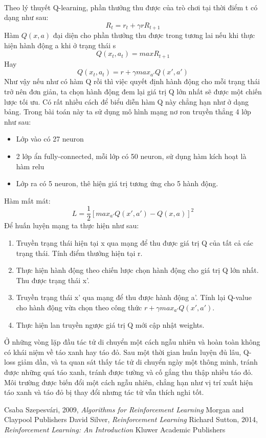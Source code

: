 \documentclass[14pt,a4paper,oneside]{report}		%
\begin{document}
\\
Theo lý thuyết Q-learning, phần thưởng thu được của trò chơi tại thời điểm t có dạng như sau:
$$R_t = r_t+\gamma rR_{t+1}$$
Hàm $Q(x,a)$ đại diện cho phần thưởng thu được trong tương lai nếu khi thực hiện hành động a khi ở trạng thái s 
$$Q(x_t,a_t) = maxR_{t+1}$$
Hay 
$$Q(x_t,a_t) = r + \gamma max_{a'}Q(x',a')$$
Như vậy nếu như có hàm Q rồi thì việc quyết định hành động cho mỗi trạng thái trở nên đơn giản, ta chọn hành động đem lại giá trị Q lớn nhất sẽ được một chiến lược tối ưu. Có rất nhiều cách để biểu diễn hàm Q này chẳng hạn như ở dạng bảng. Trong bài toán này ta sử dụng mô hình mạng nơ ron truyền thẳng 4 lớp như sau:
\begin{itemize}
\item Lớp vào có 27 neuron
\item 2 lớp ẩn fully-connected, mỗi lớp có 50 neuron, sử dụng hàm kích hoạt là hàm relu
\item Lớp ra có 5 neuron, thê hiện giá trị tương ứng cho 5 hành động.
\end{itemize}
Hàm mất mát:
$$L=\frac{1}{2}[max_{a'}Q(x',a')-Q(x,a)]^2$$
Để huấn luyện mạng ta thực hiện như sau:
\begin{enumerate}
\item Truyền trạng thái hiện tại x qua mạng để thu được giá trị Q của tất cả các trạng thái. Tính điểm thưởng hiện tại r.
\item Thực hiện hành động theo chiến lược chọn hành động cho giá trị Q lớn nhất. Thu được trạng thái x'.
\item Truyền trạng thái x' qua mạng để thu được hành động a'. Tính lại Q-value cho hành động vừa chọn theo công thức $r+\gamma max_{a'}Q(x',a')$.
\item Thực hiện lan truyền ngược giá trị Q mới cập nhật weights.
\end{enumerate}
	Ở những vòng lặp đầu tác tử di chuyển một cách ngẫu nhiên và hoàn toàn không có khái niệm về táo xanh hay táo đỏ. Sau một thời gian huấn luyện đủ lâu, Q-loss giảm dần, và ta quan sát thấy tác tử di chuyển ngày một thông minh, tránh được những quá táo xanh, tránh được tường và cố gắng thu thập nhiều táo đỏ. Môi trường được biến đổi một cách ngẫu nhiên, chẳng hạn như vị trí xuất hiện táo xanh và táo đỏ bị thay đổi nhưng tác tử vẫn thích nghi tốt.
	
\begin{thebibliography}{12}
Csaba Szepesvári, 2009, {\it Algorithms for Reinforcement Learning} Morgan and Claypool Publishers
David Silver, {\it Reinforcement Learning}
Richard Sutton, 2014, {\it  Reinforcement Learning: An Introduction} Kluwer Academic Publishers
\end{thebibliography}
\end{document}
